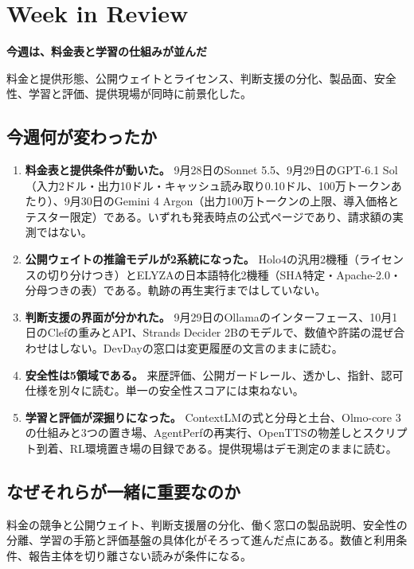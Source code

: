 \section{Week in Review}
\begin{wideflow}
{\Large\bfseries 今週は、料金表と学習の仕組みが並んだ}\par
\smallskip
{\color{SurveyMuted}料金と提供形態、公開ウェイトとライセンス、判断支援の分化、製品面、安全性、学習と評価、提供現場が同時に前景化した。}\par
\end{wideflow}

\subsection*{今週何が変わったか}
\begin{enumerate}[leftmargin=1.6em]
\item \textbf{料金表と提供条件が動いた。} 9月28日のSonnet 5.5、9月29日のGPT-6.1 Sol（入力2ドル・出力10ドル・キャッシュ読み取り0.10ドル、100万トークンあたり）、9月30日のGemini 4 Argon（出力100万トークンの上限、導入価格とテスター限定）である。いずれも発表時点の公式ページであり、請求額の実測ではない。
\item \textbf{公開ウェイトの推論モデルが2系統になった。} Holo4の汎用2機種（ライセンスの切り分けつき）とELYZAの日本語特化2機種（SHA特定・Apache-2.0・分母つきの表）である。軌跡の再生実行まではしていない。
\item \textbf{判断支援の界面が分かれた。} 9月29日のOllamaのインターフェース、10月1日のClefの重みとAPI、Strands Decider 2Bのモデルで、数値や許諾の混ぜ合わせはしない。DevDayの窓口は変更履歴の文言のままに読む。
\item \textbf{安全性は5領域である。} 来歴評価、公開ガードレール、透かし、指針、認可仕様を別々に読む。単一の安全性スコアには束ねない。
\item \textbf{学習と評価が深掘りになった。} ContextLMの式と分母と土台、Olmo-core 3の仕組みと3つの置き場、AgentPerfの再実行、OpenTTSの物差しとスクリプト到着、RL環境置き場の目録である。提供現場はデモ測定のままに読む。
\end{enumerate}

\subsection*{なぜそれらが一緒に重要なのか}
料金の競争と公開ウェイト、判断支援層の分化、働く窓口の製品説明、安全性の分離、学習の手筋と評価基盤の具体化がそろって進んだ点にある。数値と利用条件、報告主体を切り離さない読みが条件になる。

